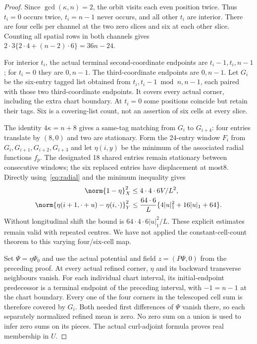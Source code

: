 \begin{proof}
Since $\gcd(\kappa,n)=2$, the orbit visits each even position twice.
Thus $t_i=0$ occurs twice, $t_i=n-1$ never occurs, and all other $t_i$ are
interior. There are four cells per channel at the two zero slices and six
at each other slice. Counting all spatial rows in both channels gives
$2\cdot3\{2\cdot4+(n-2)\cdot6\}=36n-24$.

For interior $t_i$, the actual terminal second-coordinate endpoints are
$t_i-1,t_i,n-1$; for $t_i=0$ they are $0,n-1$. The third-coordinate
endpoints are $0,n-1$. Let $G_i$ be the six-entry tagged list obtained
from $t_i,t_i-1\bmod n,n-1$, each paired with those two third-coordinate
endpoints. It covers every actual corner, including the extra chart
boundary. At $t_i=0$ some positions coincide but retain their tags.
Six is a covering-list count, not an assertion of six cells at every slice.

The identity $4\kappa=n+8$ gives a same-tag matching from $G_i$ to
$G_{i+4}$: four entries translate by $(8,0)$ and two are stationary.
Form the 24-entry window $F_i$ from $G_i,G_{i+1},G_{i+2},G_{i+3}$ and
let $\eta(i,y)$ be the minimum of the associated radial functions $f_p$.
The designated 18 shared entries remain stationary between consecutive
windows; the six replaced entries have displacement at most8. Directly
using~\eqref{eq:radial} and the minimum inequality gives
\begin{align*}
 \norm{1-\eta}_X^2&\leq4\cdot4\cdot6V/L^2,\\
 \norm{\eta(i+1,\cdot+u)-\eta(i,\cdot)}_Y^2
 &\leq\frac{64\cdot6}{L}
       \{4|u|_1^2+16|u|_1+64\}.
\end{align*}
Without longitudinal shift the bound is $64\cdot4\cdot6|u|_1^2/L$.
These explicit estimates remain valid with repeated centres. We have not
applied the constant-cell-count theorem to this varying four/six-cell map.

Set $\Psi=\eta\Psi_0$ and use the actual potential and field
$z=(P\Psi,0)$ from the preceding proof. At every actual refined corner,
$\eta$ and its backward transverse neighbours vanish. For each individual
chart interval, its initial-endpoint predecessor is a terminal endpoint of
the preceding interval, with $-1=n-1$ at the chart boundary. Every one of
the four corners in the telescoped cell sum is therefore covered by $G_i$.
Both needed first differences of $\Psi$ vanish there, so each separately
normalized refined mean is zero. No zero sum on a union is used to infer
zero sums on its pieces. The actual curl-adjoint formula proves real
membership in $U$.


\end{proof}
